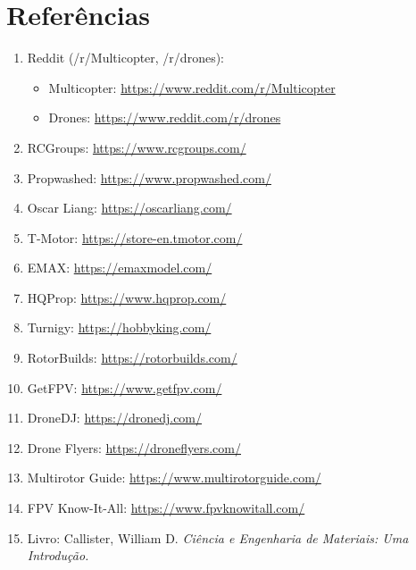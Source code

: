 \section{Referências}

\begin{enumerate}
    \item Reddit (/r/Multicopter, /r/drones):
    \begin{itemize}
        \item Multicopter: \url{https://www.reddit.com/r/Multicopter}
        \item Drones: \url{https://www.reddit.com/r/drones}
    \end{itemize}
    
    \item RCGroups: \url{https://www.rcgroups.com/}
    
    \item Propwashed: \url{https://www.propwashed.com/}
    
    \item Oscar Liang: \url{https://oscarliang.com/}
    
    \item T-Motor: \url{https://store-en.tmotor.com/}
    
    \item EMAX: \url{https://emaxmodel.com/}
    
    \item HQProp: \url{https://www.hqprop.com/}
    
    \item Turnigy: \url{https://hobbyking.com/}
    
    \item RotorBuilds: \url{https://rotorbuilds.com/}
    
    \item GetFPV: \url{https://www.getfpv.com/}
    
    \item DroneDJ: \url{https://dronedj.com/}
    
    \item Drone Flyers: \url{https://droneflyers.com/}
    
    \item Multirotor Guide: \url{https://www.multirotorguide.com/}
    
    \item FPV Know-It-All: \url{https://www.fpvknowitall.com/}
    \item Livro: Callister, William D. \textit{Ciência e Engenharia de Materiais: Uma Introdução.}


\end{enumerate}
